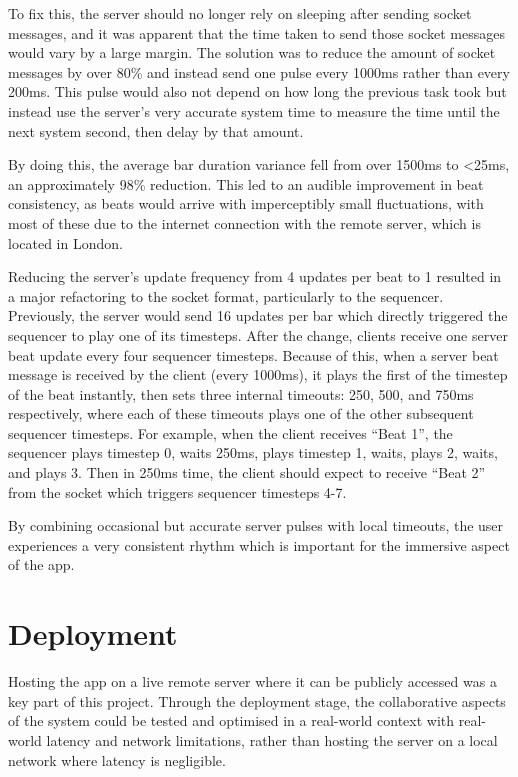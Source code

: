 To fix this, the server should no longer rely on sleeping after sending socket messages, and it was apparent that the time taken to send those socket messages would vary by a large margin. The solution was to reduce the amount of socket messages by over 80\% and instead send one pulse every 1000ms rather than every 200ms. This pulse would also not depend on how long the previous task took but instead use the server’s very accurate system time to measure the time until the next system second, then delay by that amount.

By doing this, the average bar duration variance fell from over 1500ms to <25ms, an approximately 98\% reduction. This led to an audible improvement in beat consistency, as beats would arrive with imperceptibly small fluctuations, with most of these due to the internet connection with the remote server, which is located in London.

Reducing the server’s update frequency from 4 updates per beat to 1 resulted in a major refactoring to the socket format, particularly to the sequencer. Previously, the server would send 16 updates per bar which directly triggered the sequencer to play one of its timesteps. After the change, clients receive one server beat update every four sequencer timesteps. Because of this, when a server beat message is received by the client (every 1000ms), it plays the first of the timestep of the beat instantly, then sets three internal timeouts: 250, 500, and 750ms respectively, where each of these timeouts plays one of the other subsequent sequencer timesteps. For example, when the client receives “Beat 1”, the sequencer plays timestep 0, waits 250ms, plays timestep 1, waits, plays 2, waits, and plays 3. Then in 250ms time, the client should expect to receive “Beat 2” from the socket which triggers sequencer timesteps 4-7.

By combining occasional but accurate server pulses with local timeouts, the user experiences a very consistent rhythm which is important for the immersive aspect of the app.

\section{Deployment}

Hosting the app on a live remote server where it can be publicly accessed was a key part of this project. Through the deployment stage, the collaborative aspects of the system could be tested and optimised in a real-world context with real-world latency and network limitations, rather than hosting the server on a local network where latency is negligible.

